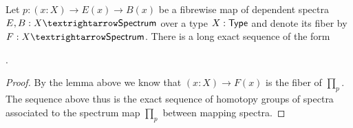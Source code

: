 \documentclass{note}
\begin{document}
\begin{theorem}
  Let $p:(x:X) → E(x) → B(x)$ be a fibrewise map of dependent spectra $E,B:X → \Spectrum$ over a type $X:\mathsf{Type}$ and denote its fiber by $F:X → \Spectrum$.
  There is a long exact sequence of the form
  \begin{center}
    .
  \end{center}
\end{theorem}
\begin{proof}
  By the lemma above we know that $(x:X) → F(x)$ is the fiber of $∏_p$.
  The sequence above thus is the exact sequence of homotopy groups of spectra associated to the spectrum map $∏_p$ between mapping spectra.
\end{proof}

\nocite{*}
\printbibliography
\end{document}
